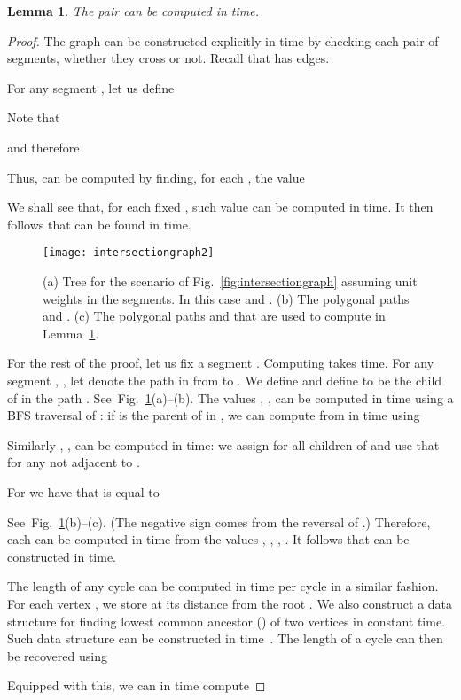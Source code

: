 \documentclass[11pt,a4paper]{article}
\newtheorem{lemma}[definition]{Lemma}
\begin{document}
\begin{lemma}\label{le:time}
	The pair  can be computed in  time.
\end{lemma}
\begin{proof}
	The graph  can be constructed explicitly in  time by checking
	each pair of segments, whether they cross or not.
	Recall that  has  edges.

	For any segment , let us define
	
	Note that 
	
	and therefore 
	
	Thus,  can be computed by finding, for each ,
	the value 
	
	We shall see that, for each fixed
	, such value  
	can be computed in  time. 
	It then follows that   can be found in 
	 time.	
	
	\begin{figure}
	\centering
		\texttt{[image: intersectiongraph2]}
		\caption{(a) Tree  for the scenario of Fig.~\ref{fig:intersectiongraph} assuming unit weights in the segments. 
				In this case  and .
			(b) The polygonal paths  and .
			(c) The polygonal paths  
				and  that are used to compute 
				in Lemma~\ref{le:time}.
			}
	\label{fig:intersectiongraph2}
	\end{figure}
	
	For the rest of the proof, let us fix a segment . 
	Computing  takes  time. 
	For any segment , , let  denote the path in  from  
	to . We define  
	and define  to be the child of  in the path .
	See~Fig.~\ref{fig:intersectiongraph2}(a)--(b).
	The values , , can be computed in  
	time using a BFS traversal of : 
	if  is the parent of  in , we can compute 
	from  in  time using  
	
	Similarly , , can be computed in  time:
	we assign  for all children  of  and use
	that  for any  not adjacent to .
	
	For  we have that  is equal to
	
	See~Fig.~\ref{fig:intersectiongraph2}(b)--(c).
	(The negative sign comes from the reversal of .)
	Therefore, each  can be computed in  time from the values , , , .
	It follows that  can be constructed in  time.
	
	The length of any cycle  can be computed in  time per cycle in a similar fashion.
	For each vertex , we store at  its distance  from the root .
	We also construct a data structure for finding lowest common ancestor () of two vertices in constant
	time. Such data structure can be constructed in  time~\cite{lca1,lca2}. The length of a cycle can then be recovered using
	
	Equipped with this, we can in  time compute
	
\end{proof}
\end{document}
